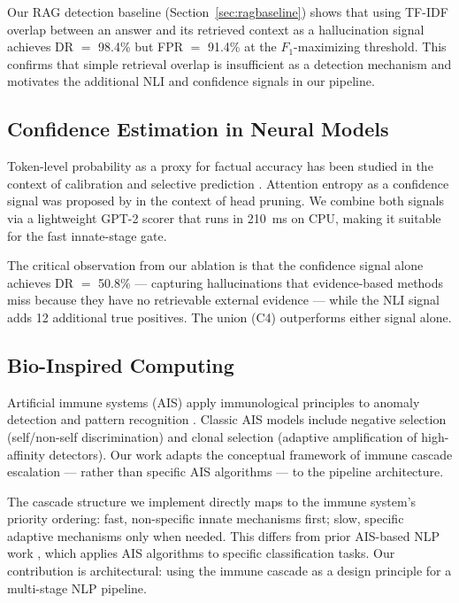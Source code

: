 \documentclass[11pt,a4paper]{article}
\newcommand{\fone}{F_1}
\begin{document}
Our RAG detection baseline (Section~\ref{sec:ragbaseline}) shows that using
TF-IDF overlap between an answer and its retrieved context as a hallucination
signal achieves DR $=$ 98.4\% but FPR $=$ 91.4\% at the $\fone$-maximizing
threshold. This confirms that simple retrieval overlap is insufficient as a
detection mechanism and motivates the additional NLI and confidence signals in
our pipeline.

\subsection{Confidence Estimation in Neural Models}

Token-level probability as a proxy for factual accuracy has been studied in the
context of calibration \citep{guo2017calibration} and selective prediction
\citep{geifman2017selective}. Attention entropy as a confidence signal was
proposed by \citet{voita2019analyzing} in the context of head pruning. We
combine both signals via a lightweight GPT-2 scorer \citep{radford2019language}
that runs in 210~ms on CPU, making it suitable for the fast innate-stage gate.

The critical observation from our ablation is that the confidence signal alone
achieves DR $=$ 50.8\% --- capturing hallucinations that evidence-based methods
miss because they have no retrievable external evidence --- while the NLI signal
adds 12 additional true positives. The union (C4) outperforms either signal
alone.

\subsection{Bio-Inspired Computing}

Artificial immune systems (AIS) apply immunological principles to anomaly
detection and pattern recognition \citep{forrest1994self,hofmeyr2000architecture,
decastro2002artificial}. Classic AIS models include negative selection
(self/non-self discrimination) and clonal selection (adaptive amplification of
high-affinity detectors). Our work adapts the conceptual framework of immune
cascade escalation --- rather than specific AIS algorithms --- to the pipeline
architecture.

The cascade structure we implement directly maps to the immune system's priority
ordering: fast, non-specific innate mechanisms first; slow, specific adaptive
mechanisms only when needed. This differs from prior AIS-based NLP work
\citep{wang2007immunity,bezerra2010immune}, which applies AIS algorithms to
specific classification tasks. Our contribution is architectural: using the
immune cascade as a design principle for a multi-stage NLP pipeline.
\end{document}
